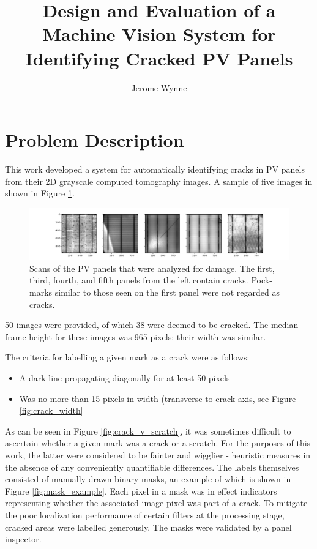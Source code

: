 \documentclass[11pt]{article} %
\title{Design and Evaluation of a Machine Vision System for Identifying Cracked PV Panels}
\author{Jerome Wynne}
\begin{document}
\maketitle

\section{Problem Description}

This work developed a system for automatically identifying cracks in PV panels from their 2D grayscale computed tomography images. A sample of five images in shown in Figure \ref{fig:sample_panels}.
\begin{figure}[h!]
\includegraphics[width=\textwidth]{sample_panels.pdf}
\caption{Scans of the PV panels that were analyzed for damage. The first, third, fourth, and fifth panels from the left contain cracks. Pock-marks similar to those seen on the first panel were not regarded as cracks.}
\label{fig:sample_panels}
\end{figure}
50 images were provided, of which 38 were deemed to be cracked. The median frame height for these images was 965 pixels; their width was similar.

 The criteria for labelling a given mark as a crack were as follows:
\begin{itemize}
	\item A dark line propagating diagonally for at least 50 pixels
	\item Was no more than 15 pixels in width (transverse to crack axis, see Figure \ref{fig:crack_width}
\end{itemize}
As can be seen in Figure \ref{fig:crack_v_scratch}, it was sometimes difficult to ascertain whether a given mark was a crack or a scratch. For the purposes of this work, the latter were considered to be fainter and wigglier - heuristic measures in the absence of any conveniently quantifiable differences. The labels themselves consisted of manually drawn binary masks, an example of which is shown in Figure \ref{fig:mask_example}. Each pixel in a mask was in effect indicators representing whether the associated image pixel was part of a crack. To mitigate the poor localization performance of certain filters at the processing stage, cracked areas were labelled generously. The masks were validated by a panel inspector.
\end{document}
